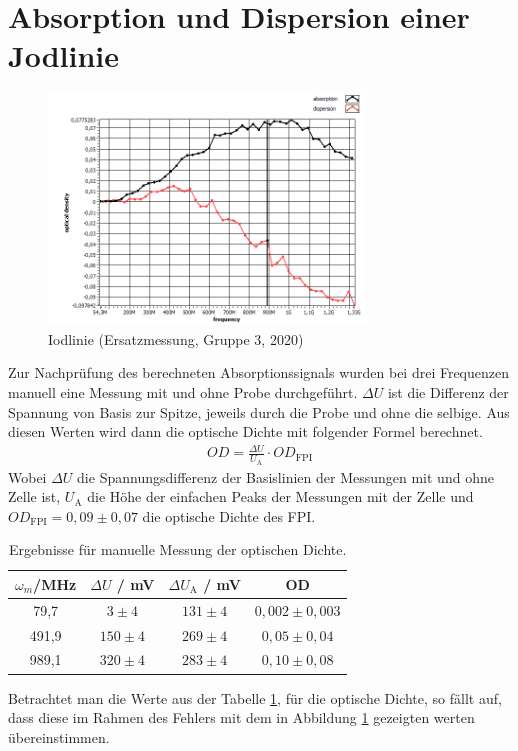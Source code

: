 
\newpage
\section{Absorption und Dispersion einer Jodlinie}


\begin{figure}[h]
    \centering
    \includegraphics[width=0.75\textwidth]{Bilder/Jodlinie/Gruppe32020Iododgraph1 Kopie.png}
    \caption[Iodlinie]{Iodlinie (Ersatzmessung, Gruppe 3, 2020)}
    \label{fig:IodlinieG32020}
\end{figure}


Zur Nachprüfung des berechneten Absorptionssignals wurden bei drei Frequenzen manuell eine Messung mit und ohne Probe durchgeführt. $\Delta U$ ist die Differenz der Spannung von Basis zur Spitze, jeweils durch die Probe und ohne die selbige. Aus diesen Werten wird dann die optische Dichte mit folgender Formel berechnet.
\begin{align}
    OD = \frac{\Delta U}{U_\mathrm{A}} \cdot OD_\mathrm{FPI}
\end{align}
Wobei $\Delta U$ die Spannungsdifferenz der Basislinien der Messungen mit und ohne Zelle ist, $U_\mathrm{A}$ die Höhe der einfachen Peaks der Messungen mit der Zelle und $OD_\mathrm{FPI} = 0,09 \pm 0,07$ die optische Dichte des FPI.
\begin{table}[h]
    \centering
    \begin{tabular}{c|cc|c}
        $\omega_m$/MHz & $\Delta U$ / mV & $\Delta U_\mathrm{A}$ / mV & OD \\ \hline
        79,7 & $3 \pm 4$ & $131 \pm 4$ & $0,002 \pm 0,003$  \\
        491,9 & $150 \pm 4$ & $269 \pm 4$ & $0,05 \pm 0,04$ \\
        989,1 & $320 \pm 4$ & $283 \pm 4$ & $0,10 \pm 0,08$ \\
    \end{tabular}
    \caption{Ergebnisse für manuelle Messung der optischen Dichte.}
    \label{tab:ODIod}
\end{table}
Betrachtet man die Werte aus der Tabelle \ref{tab:ODIod}, für die optische Dichte, so fällt auf, dass diese im Rahmen des Fehlers mit dem in Abbildung \ref{fig:IodlinieG32020} gezeigten werten übereinstimmen. 


